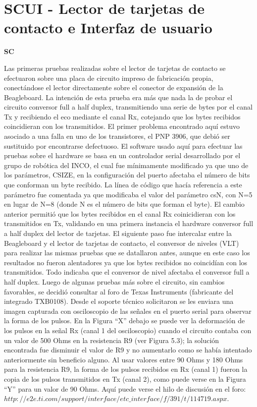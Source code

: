 \section{SCUI - Lector de tarjetas de contacto e Interfaz de usuario}

{\bf{SC}}

Las primeras pruebas realizadas sobre el lector de tarjetas de contacto se efectuaron sobre una
placa de circuito impreso de fabricación propia, conectándose el lector directamente sobre el 
conector de expansión de la Beagleboard. La intención de esta prueba era más que nada la de probar
el circuito conversor full a half duplex, transmitiendo una serie de bytes por el canal Tx y recibiendo
el eco mediante el canal Rx, cotejando que los bytes recibidos coincidieran con los transmitidos. 
El primer problema encontrado aquí estuvo asociado a una falla en uno de los transistores, el PNP 3906, 
que debió ser sustituido por encontrarse defectuoso.
El software usado aquí para efectuar las pruebas sobre el hardware se basa en un controlador serial 
desarrollado por el grupo de robótica del INCO, el cual fue mínimamente modificado ya que uno de los 
parámetros, CSIZE, en la configuración del puerto afectaba el número de bits que conforman un byte recibido. 
La línea de código que hacía referencia a este parámetro fue comentada ya que modificaba el valor del parámetro 
csN, con N=5 en lugar de N=8 (donde N es el número de bits que forman el byte). 
El cambio anterior permitió que los bytes recibidos en el canal Rx coinicidieran con los transmitidos en Tx, 
validando en una primera instancia el hardware conversor full a half duplex del lector de tarjetas.
El siguiente paso fue intercalar entre la Beagleboard y el lector de tarjetas de contacto, el conversor de niveles (VLT) para realizar las mismas pruebas que se datallaron antes, aunque en este caso los resultados no fueron alentadores ya que los bytes recibidos no coincidían con los transmitidos. Todo indicaba que el conversor de nivel afectaba el conversor full a half duplex. Luego de algunas pruebas más sobre el circuito, sin cambios favorables, se decidió consultar al foro de Texas Instruments (fabricante del integrado TXB0108). Desde el soporte técnico solicitaron se les enviara una imagen capturada con osciloscopio de las señales en el puerto serial para observar la forma de los pulsos. En la Figura “X” debajo se puede ver la deformación de los pulsos en la señal Rx (canal 1 del osciloscopio) cuando el circuito contaba con un valor de 500 Ohms en la resistencia R9 (ver Figura 5.3); la solución encontrada fue disminuir el valor de R9 y no aumentarlo como se había intentado anteriormente sin beneficio alguno. Al usar valores entre 90 Ohms y 180 Ohms para la resistencia R9, la forma de los pulsos recibidos en Rx (canal 1) fueron la copia de los pulsos transmitidos en Tx (canal 2), como puede verse en la Figura “Y” para un valor de 90 Ohms. 
Aquí puede verse el hilo de discusión en el foro: ${http://e2e.ti.com/support/interface/etc\_interface/f/391/t/114719.aspx}$.

